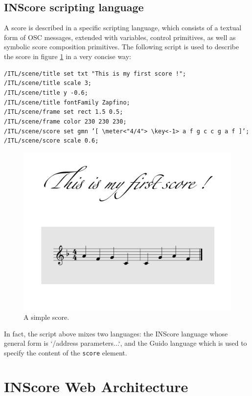 \documentclass{article}
\newcommand{\icode}[1]	{{\small \texttt{#1}}}
\newcommand{\code}[1]	{\vspace{-1em}\begin{center}\colorbox{mygrey}{\begin{minipage}[t]{0.98\columnwidth} {\scriptsize \texttt{#1}}\end{minipage}}\end{center}}
\begin{document}
\subsection{INScore scripting language}
A score is described in a specific scripting language, which consists of a textual form of OSC messages, extended with variables, control primitives, as well as symbolic score composition primitives. The following script is used to describe the score in figure \ref{fig:score} in a very concise way:
\code{/ITL/scene/title set txt "This is my first score !"; \\
/ITL/scene/title scale 3;\\
/ITL/scene/title y -0.6;\\
/ITL/scene/title fontFamily Zapfino;\\
/ITL/scene/frame set rect 1.5 0.5;\\
/ITL/scene/frame color 230 230 230;\\
/ITL/scene/score set gmn 
   '[ \textbackslash meter<"4/4"> \textbackslash key<-1> a f g c c g a f ]';\\
/ITL/scene/score scale 0.6;}

\begin{figure}[h]
\centering
\includegraphics[width=0.7\columnwidth]{rsrc/inscore-exemple.png}
\caption{A simple score.}
\label{fig:score}
\end{figure}
In fact, the script above mixes two languages: the INScore language whose general form is `/address parameters...`, and the Guido language \cite{hoos98} which is used to specify the content of the \icode{score} element.

\section{INScore Web Architecture}\label{sec:arch}
\end{document}
